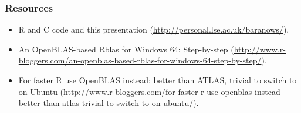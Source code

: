 \documentclass[handout]{beamer}
\begin{document}
\begin{frame}
	\frametitle{Resources}
	\begin{itemize}
		\item R and C code and this presentation (\url{http://personal.lse.ac.uk/baranows/}).
		\item An OpenBLAS-based Rblas for Windows 64: Step-by-step (\url{http://www.r-bloggers.com/an-openblas-based-rblas-for-windows-64-step-by-step/}).
		\item For faster R use OpenBLAS instead: better than ATLAS, trivial to switch to on Ubuntu (\url{http://www.r-bloggers.com/for-faster-r-use-openblas-instead-better-than-atlas-trivial-to-switch-to-on-ubuntu/}).
	\end{itemize}
\end{frame}
\end{document}

